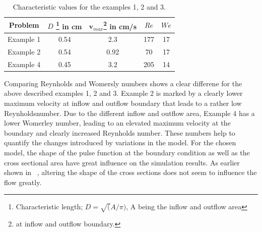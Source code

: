 \begin{table}\begin{center}
    \begin{tabular}{ | c | c | c | c | c |}
    \hline
    Problem & $D$ \footnote{Characteristic length; $D=\sqrt(A/\pi)$, A being the inflow and outflow area} in cm & $\mathbf{v}_{max}$\footnote{at inflow and outflow boundary.} in cm/s  & $Re$ & $We$ \\ \hline\hline
	Example 1 	&	0.54 & 2.3 & 177 & 17	\\ \hline
	Example 2	&	0.54 & 0.92 & 70 & 17	\\ \hline
	Example 4	&	0.45 & 3.2 	& 205 & 14	\\ \hline
    \end{tabular}
	\label{tab:Re_We}
	\caption{Characteristic values for the examples 1, 2 and 3.}
\end{center}\end{table}

Comparing Reynholds and Womersly numbers shows a clear differene for
the above described examples 1, 2 and 3. Example 2 is marked by a
clearly lower maximum velocity at inflow and outflow boundary that
leads to a rather low Reynholdsnumber. Due to the different inflow and
outflow area, Example 4 has a lower Womerley number, leading to an
elevated maximum velocity at the boundary and clearly increased
Reynholds number. These numbers help to quantify the changes
introduced by variations in the model. For the chosen model, the shape
of the pulse function at the boundary condition as well as the cross
sectional area have great influence on the simulation results. As
earlier shown in ~\cite{Loth2001}, altering the shape of
the cross sections does not seem to influence the flow greatly.


